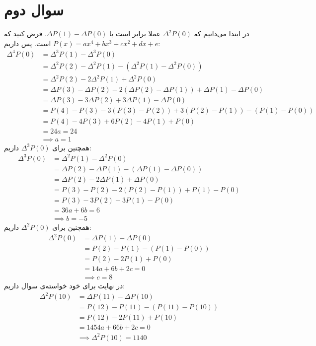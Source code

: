 \documentclass[]{article}
\begin{document}
\section*{سوال دوم}
در ابتدا می‌‌دانیم که
$\Delta^2P(0)$
عملا برابر است با
$\Delta P(1) - \Delta P(0)$.
فرض کنید که
$P(x) = ax^4 + bx^3 + cx^2 + dx + e$
است.
پس داریم:
\begin{align*}
    \Delta^4P(0) &= \Delta^3 P(1) - \Delta^3 P(0)\\
    &= \Delta^2 P(2) - \Delta^2 P(1) - (\Delta^2 P(1) - \Delta^2 P(0))\\
    &= \Delta^2 P(2) - 2\Delta^2 P(1) + \Delta^2 P(0)\\
    &= \Delta P(3) - \Delta P(2) - 2(\Delta P(2) - \Delta P(1)) + \Delta P(1) - \Delta P(0)\\
    &= \Delta P(3) - 3\Delta P(2) + 3\Delta P(1) - \Delta P(0)\\
    &= P(4) - P(3) - 3(P(3) - P(2)) + 3(P(2) - P(1)) - (P(1) - P(0))\\
    &= P(4) - 4P(3) + 6P(2) - 4P(1) + P(0)\\
    &= 24a = 24\\
    &\implies \boxed{a = 1}
\end{align*}
همچنین برای
$\Delta^3 P(0)$
داریم:
\begin{align*}
    \Delta^3P(0) &= \Delta^2 P(1) - \Delta^2 P(0)\\
    &= \Delta P(2) - \Delta P(1) - (\Delta P(1) - \Delta P(0))\\
    &= \Delta P(2) - 2\Delta P(1) + \Delta P(0)\\
    &= P(3) - P(2) - 2(P(2) - P(1)) + P(1) - P(0)\\
    &= P(3) - 3P(2) + 3P(1) - P(0)\\
    &= 36a + 6b = 6\\
    &\implies \boxed{b = -5}
\end{align*}
همچنین برای
$\Delta^2 P(0)$
داریم:
\begin{align*}
    \Delta^2P(0) &= \Delta P(1) - \Delta P(0)\\
    &= P(2) - P(1) - (P(1) - P(0))\\
    &= P(2) - 2 P(1) + P(0)\\
    &= 14a + 6b + 2c = 0\\
    &\implies \boxed{c = 8}
\end{align*}
در نهایت برای خود خواسته‌ی سوال داریم:
\begin{align*}
    \Delta^2P(10) &= \Delta P(11) - \Delta P(10)\\
    &= P(12) - P(11) - (P(11) - P(10))\\
    &= P(12) - 2 P(11) + P(10)\\
    &= 1454a + 66b + 2c = 0\\
    &\implies \boxed{\Delta^2P(10) = 1140}
\end{align*}
\end{document}
